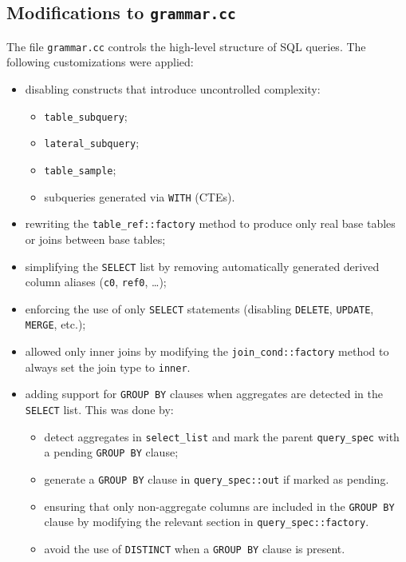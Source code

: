 \documentclass{article}
\begin{document}
\subsection{Modifications to \texttt{grammar.cc}}
The file \texttt{grammar.cc} controls the high-level structure of SQL queries.
The following customizations were applied:
\begin{itemize}
    \item disabling constructs that introduce uncontrolled complexity:
    \begin{itemize}
        \item \texttt{table\_subquery};
        \item \texttt{lateral\_subquery};
        \item \texttt{table\_sample};
        \item subqueries generated via \texttt{WITH} (CTEs).
    \end{itemize}
    \item rewriting the \texttt{table\_ref::factory} method to produce
          only real base tables or joins between base tables;
    \item simplifying the \texttt{SELECT} list by removing automatically generated
          derived column aliases (\texttt{c0}, \texttt{ref0}, \ldots);
    \item enforcing the use of only \texttt{SELECT} statements (disabling
          \texttt{DELETE}, \texttt{UPDATE}, \texttt{MERGE}, etc.);
    \item allowed only inner joins by modifying the \texttt{join\_cond::factory}
          method to always set the join type to \texttt{inner}.
    \item adding support for \texttt{GROUP BY} clauses when aggregates are
          detected in the \texttt{SELECT} list. This was done by:
    \begin{itemize}
        \item detect aggregates in \texttt{select\_list} and
              mark the parent \texttt{query\_spec} with a pending \texttt{GROUP BY}
              clause;
        \item generate a \texttt{GROUP BY} clause in \texttt{query\_spec::out}
              if marked as pending. 
        \item ensuring that only non-aggregate columns are included in the
              \texttt{GROUP BY} clause by modifying the relevant section in
              \texttt{query\_spec::factory}.
        \item avoid the use of \texttt{DISTINCT} when a \texttt{GROUP BY} clause is present.
    \end{itemize}
\end{itemize}
\end{document}
